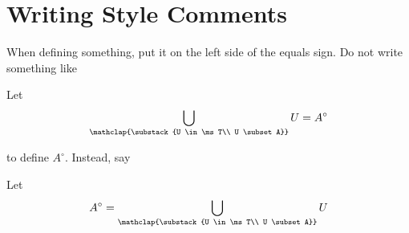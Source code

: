 \documentclass{fkpset}
\begin{document}
\section{Writing Style Comments}
\begin{problem}[A1]
  When defining something, put it on the left side of the equals sign. Do not
  write something like
  \begin{leftbar}
    Let
    \[
      \bigcup_{\mathclap{\substack{U \in \ms T\\ U \subset A}}} U = A^\circ
    \]
  \end{leftbar}
  to define $A^\circ$. Instead, say
  \begin{leftbar}
    Let
    \[
      A^\circ = \bigcup_{\mathclap{\substack{U \in \ms T\\ U \subset A}}} U
    \]
  \end{leftbar}
\end{problem}
\end{document}
